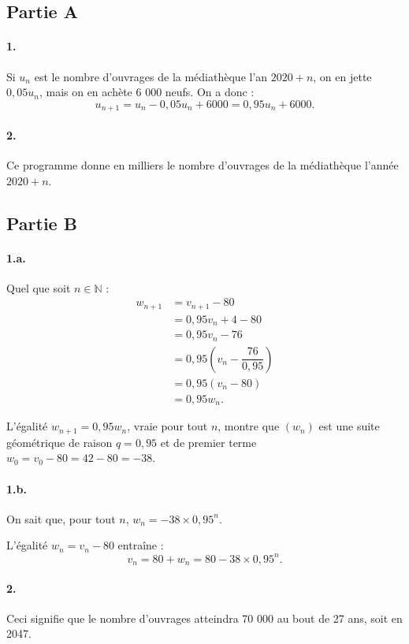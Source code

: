 \subsection*{Partie A}

\paragraph{1.} Si \( u_n \) est le nombre d'ouvrages de la médiathèque l'an \( 2020 + n \), on en jette \( 0{,}05u_n \), mais on en achète 6 000 neufs. On a donc :
\[
u_{n+1} = u_n - 0{,}05u_n + 6000 = 0{,}95u_n + 6000.
\]

\paragraph{2.} Ce programme donne en milliers le nombre d'ouvrages de la médiathèque l'année \( 2020 + n \).

\subsection*{Partie B}

\paragraph{1.a.} Quel que soit \( n \in \mathbb{N} \) :
\begin{align*}
w_{n+1} &= v_{n+1} - 80 \\
&= 0{,}95 v_n + 4 - 80 \\
&= 0{,}95 v_n - 76 \\
&= 0{,}95 \left(v_n - \dfrac{76}{0{,}95}\right) \\
&= 0{,}95(v_n - 80) \\
&= 0{,}95w_n.
\end{align*}

L'égalité \( w_{n+1} = 0{,}95w_n \), vraie pour tout \( n \), montre que \( (w_n) \) est une suite géométrique de raison \( q = 0{,}95 \) et de premier terme \( w_0 = v_0 - 80 = 42 - 80 = -38 \).

\paragraph{1.b.} On sait que, pour tout \( n \), \( w_n = -38 \times 0{,}95^n \).

L'égalité \( w_n = v_n - 80 \) entraîne :
\[
v_n = 80 + w_n = 80 - 38 \times 0{,}95^n.
\]

\paragraph{2.} Ceci signifie que le nombre d'ouvrages atteindra 70 000 au bout de 27 ans, soit en 2047.
